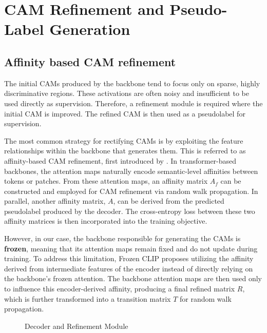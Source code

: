 \section{CAM Refinement and Pseudo-Label Generation}
\label{sec:refinement}
\subsection{Affinity based CAM refinement}  
The initial CAMs produced by the backbone tend to focus only on sparse, highly discriminative regions. These activations are often noisy and insufficient to be used directly as supervision. Therefore, a refinement module is required where the initial CAM is improved. The refined CAM is then used as a pseudolabel for supervision.  

The most common strategy for rectifying CAMs is by exploiting the feature relationships within the backbone that generates them. This is referred to as affinity-based CAM refinement, first introduced by \cite{wsss_affinitynet}. In transformer-based backbones, the attention maps naturally encode semantic-level affinities between tokens or patches. From these attention maps, an affinity matrix $A_f$ can be constructed and employed for CAM refinement via random walk propagation. In parallel, another affinity matrix, $A$, can be derived from the predicted pseudolabel produced by the decoder. The cross-entropy loss between these two affinity matrices is then incorporated into the training objective.  

However, in our case, the backbone responsible for generating the CAMs is \textbf{frozen}, meaning that its attention maps remain fixed and do not update during training. To address this limitation, Frozen CLIP \cite{wsss_frozen_clip} proposes utilizing the affinity derived from intermediate features of the encoder instead of directly relying on the backbone’s frozen attention. The backbone attention maps are then used only to influence this encoder-derived affinity, producing a final refined matrix $R$, which is further transformed into a transition matrix $T$ for random walk propagation.  

\begin{figure}[t]
    \centering
    \caption{Decoder and Refinement Module}
    \label{fig:decoder}
\end{figure}

